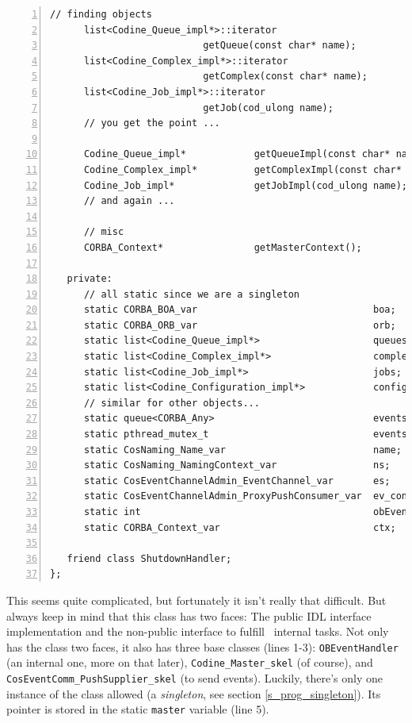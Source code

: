\begin{Verbatim}[frame=lines, numbers=left, fontsize=\small, framerule=1mm]
      // finding objects
      list<Codine_Queue_impl*>::iterator         
                           getQueue(const char* name);
      list<Codine_Complex_impl*>::iterator
                           getComplex(const char* name);
      list<Codine_Job_impl*>::iterator          
                           getJob(cod_ulong name);
      // you get the point ...

      Codine_Queue_impl*            getQueueImpl(const char* name);
      Codine_Complex_impl*          getComplexImpl(const char* name);
      Codine_Job_impl*              getJobImpl(cod_ulong name);
      // and again ...

      // misc
      CORBA_Context*                getMasterContext();

   private:
      // all static since we are a singleton
      static CORBA_BOA_var                               boa;
      static CORBA_ORB_var                               orb;
      static list<Codine_Queue_impl*>                    queues;
      static list<Codine_Complex_impl*>                  complexes;
      static list<Codine_Job_impl*>                      jobs;
      static list<Codine_Configuration_impl*>            configurations;
      // similar for other objects...
      static queue<CORBA_Any>                            events;
      static pthread_mutex_t                             events_lock;
      static CosNaming_Name_var                          name;
      static CosNaming_NamingContext_var                 ns;
      static CosEventChannelAdmin_EventChannel_var       es;
      static CosEventChannelAdmin_ProxyPushConsumer_var  ev_consumer;
      static int                                         obEventFd[2];
      static CORBA_Context_var                           ctx;

   friend class ShutdownHandler;
};
\end{Verbatim}

This seems quite complicated, but fortunately it isn't really that difficult.
But always keep in mind that this class has two faces: The public IDL
interface implementation and the non-public interface to fulfill \qidl\
internal tasks. Not only has the class two faces, it also has three base
classes (lines 1-3): \texttt{OBEventHandler} (an internal one, more on that 
later), \texttt{Codine\_Master\_skel} (of course), and
\texttt{CosEventComm\_PushSupplier\_skel} (to send events). Luckily, there's
only one instance of the class allowed (a \emph{singleton}, see section
\ref{s_prog_singleton}). Its pointer is stored in the static \texttt{master}
variable (line 5).

